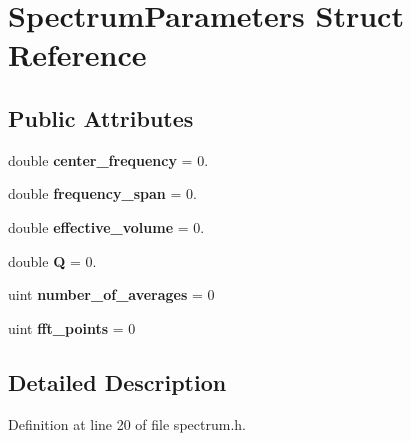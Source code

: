 \hypertarget{struct_spectrum_parameters}{}\section{Spectrum\+Parameters Struct Reference}
\label{struct_spectrum_parameters}
\subsection*{Public Attributes}
\begin{DoxyCompactItemize}
\item 
double {\bfseries center\+\_\+frequency} = 0.\hypertarget{struct_spectrum_parameters_a56975b921e499f10c9fb4c08ba828547}{}\label{struct_spectrum_parameters_a56975b921e499f10c9fb4c08ba828547}

\item 
double {\bfseries frequency\+\_\+span} = 0.\hypertarget{struct_spectrum_parameters_a2941b715e103c34a0356f4ee49745567}{}\label{struct_spectrum_parameters_a2941b715e103c34a0356f4ee49745567}

\item 
double {\bfseries effective\+\_\+volume} = 0.\hypertarget{struct_spectrum_parameters_a2c0a77f3fa260127a17376041e5fe109}{}\label{struct_spectrum_parameters_a2c0a77f3fa260127a17376041e5fe109}

\item 
double {\bfseries Q} = 0.\hypertarget{struct_spectrum_parameters_a753173b3591c797a15b8d536eef4c7f8}{}\label{struct_spectrum_parameters_a753173b3591c797a15b8d536eef4c7f8}

\item 
uint {\bfseries number\+\_\+of\+\_\+averages} = 0\hypertarget{struct_spectrum_parameters_afa3f30ba0906616b6e0bfb4c7b326806}{}\label{struct_spectrum_parameters_afa3f30ba0906616b6e0bfb4c7b326806}

\item 
uint {\bfseries fft\+\_\+points} = 0\hypertarget{struct_spectrum_parameters_a4cb7ebf7f023c2c82ccfd888da3e5ff3}{}\label{struct_spectrum_parameters_a4cb7ebf7f023c2c82ccfd888da3e5ff3}

\end{DoxyCompactItemize}


\subsection{Detailed Description}


Definition at line 20 of file spectrum.\+h.

